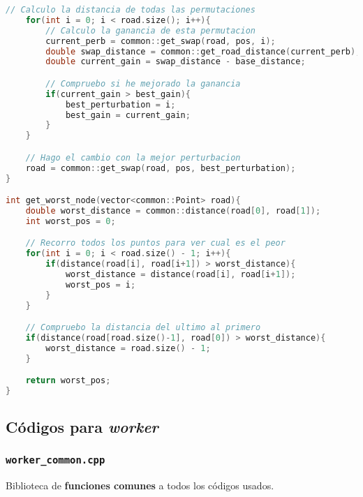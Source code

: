 \documentclass[10pt, a4paper]{article}
\theoremstyle{theorem-style}
\theoremstyle{theorem-style}
\theoremstyle{definition-style}
\theoremstyle{remark-style}
\theoremstyle{example-style}
\theoremstyle{definition-style}
\theoremstyle{remark-style}
\begin{document}
\begin{lstlisting}[language=C]
    // Calculo la distancia de todas las permutaciones
    for(int i = 0; i < road.size(); i++){
        // Calculo la ganancia de esta permutacion
        current_perb = common::get_swap(road, pos, i);
        double swap_distance = common::get_road_distance(current_perb);
        double current_gain = swap_distance - base_distance;

        // Compruebo si he mejorado la ganancia
        if(current_gain > best_gain){
            best_perturbation = i;
            best_gain = current_gain;
        }
    }

    // Hago el cambio con la mejor perturbacion
    road = common::get_swap(road, pos, best_perturbation);
}

int get_worst_node(vector<common::Point> road){
    double worst_distance = common::distance(road[0], road[1]);
    int worst_pos = 0;

    // Recorro todos los puntos para ver cual es el peor
    for(int i = 0; i < road.size() - 1; i++){
        if(distance(road[i], road[i+1]) > worst_distance){
            worst_distance = distance(road[i], road[i+1]);
            worst_pos = i;
        }
    }

    // Compruebo la distancia del ultimo al primero
    if(distance(road[road.size()-1], road[0]) > worst_distance){
        worst_distance = road.size() - 1;
    }

    return worst_pos;
}
\end{lstlisting}

\subsection*{Códigos para \emph{worker}}

\subsubsection*{\texttt{worker\_common.cpp}}

Biblioteca de \textbf{funciones comunes} a todos los códigos usados.
\end{document}
